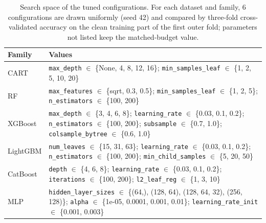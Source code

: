\begin{table}[t]
\centering
\footnotesize
\caption{Search space of the tuned configurations. For each dataset and family, 6 configurations are drawn uniformly (seed 42) and compared by three-fold cross-validated accuracy on the clean training part of the first outer fold; parameters not listed keep the matched-budget value.}
\label{tab:search}
\begin{tabular}{@{}lp{9.5cm}@{}}
\toprule
Family & Values \\
\midrule
CART & \texttt{max\_depth} $\in$ \{None, 4, 8, 12, 16\}; \texttt{min\_samples\_leaf} $\in$ \{1, 2, 5, 10, 20\} \\
RF & \texttt{max\_features} $\in$ \{sqrt, 0.3, 0.5\}; \texttt{min\_samples\_leaf} $\in$ \{1, 2, 5\}; \texttt{n\_estimators} $\in$ \{100, 200\} \\
XGBoost & \texttt{max\_depth} $\in$ \{3, 4, 6, 8\}; \texttt{learning\_rate} $\in$ \{0.03, 0.1, 0.2\}; \texttt{n\_estimators} $\in$ \{100, 200\}; \texttt{subsample} $\in$ \{0.7, 1.0\}; \texttt{colsample\_bytree} $\in$ \{0.6, 1.0\} \\
LightGBM & \texttt{num\_leaves} $\in$ \{15, 31, 63\}; \texttt{learning\_rate} $\in$ \{0.03, 0.1, 0.2\}; \texttt{n\_estimators} $\in$ \{100, 200\}; \texttt{min\_child\_samples} $\in$ \{5, 20, 50\} \\
CatBoost & \texttt{depth} $\in$ \{4, 6, 8\}; \texttt{learning\_rate} $\in$ \{0.03, 0.1, 0.2\}; \texttt{iterations} $\in$ \{100, 200\}; \texttt{l2\_leaf\_reg} $\in$ \{1, 3, 10\} \\
MLP & \texttt{hidden\_layer\_sizes} $\in$ \{(64,), (128, 64), (128, 64, 32), (256, 128)\}; \texttt{alpha} $\in$ \{1e-05, 0.0001, 0.001, 0.01\}; \texttt{learning\_rate\_init} $\in$ \{0.001, 0.003\} \\
\bottomrule
\end{tabular}
\end{table}

